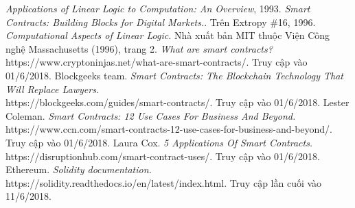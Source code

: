 \documentclass[a4paper]{article}
\begin{document}
\newpage
{}
\begin{thebibliography}{99999}
 {\em Applications of Linear Logic to Computation: An Overview}, 1993.
 {\em Smart Contracts: Building Blocks for Digital Markets.}. Trên Extropy \#16, 1996.
 {\em Computational Aspects of Linear Logic.} Nhà xuất bản MIT thuộc Viện Công nghệ Massachusetts (1996), trang 2.
 {\em What are smart contracts?}\\
{https://www.cryptoninjas.net/what-are-smart-contracts/}. Truy cập vào 01/6/2018.
 Blockgeeks team. {\em Smart Contracts: The Blockchain Technology That Will Replace Lawyers.}\\ {https://blockgeeks.com/guides/smart-contracts/}. Truy cập vào 01/6/2018.
 Lester Coleman. {\em Smart Contracts: 12 Use Cases For Business And Beyond.}\\
{https://www.ccn.com/smart-contracts-12-use-cases-for-business-and-beyond/}. Truy cập vào 01/6/2018.
 Laura Cox. {\em 5 Applications Of Smart Contracts.}\\
{https://disruptionhub.com/smart-contract-uses/}. Truy cập vào 01/6/2018.
 Ethereum. {\em Solidity documentation.}\\
{https://solidity.readthedocs.io/en/latest/index.html}. Truy cập lần cuối vào 11/6/2018.
\end{thebibliography}
\end{document}
